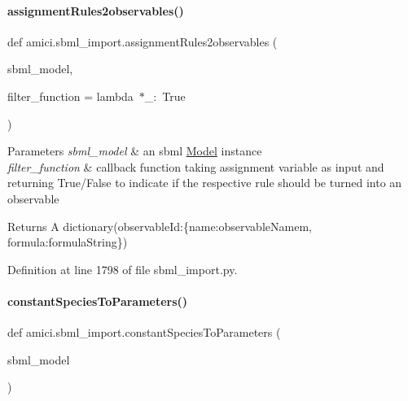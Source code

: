 \paragraph{\texorpdfstring{assignment\+Rules2observables()}{assignmentRules2observables()}}
{\footnotesize\ttfamily def amici.\+sbml\+\_\+import.\+assignment\+Rules2observables (\begin{DoxyParamCaption}\item[{}]{sbml\+\_\+model,  }\item[{}]{filter\+\_\+function = {\ttfamily lambda~$\ast$\+\_\+\+:~True} }\end{DoxyParamCaption})}


\begin{DoxyParams}{Parameters}
{\em sbml\+\_\+model} & an sbml \mbox{\hyperlink{classamici_1_1_model}{Model}} instance \\
\hline
{\em filter\+\_\+function} & callback function taking assignment variable as input and returning True/\+False to indicate if the respective rule should be turned into an observable\\
\hline
\end{DoxyParams}
\begin{DoxyReturn}{Returns}
A dictionary(observable\+Id\+:\{\textquotesingle{}name\textquotesingle{}\+:observable\+Namem, \textquotesingle{}formula\textquotesingle{}\+:formula\+String\}) 
\end{DoxyReturn}


Definition at line 1798 of file sbml\+\_\+import.\+py.

\mbox{\label{namespaceamici_1_1sbml__import_a9cee719122a45a0ac8590514a19ed5cc}} 
\paragraph{\texorpdfstring{constant\+Species\+To\+Parameters()}{constantSpeciesToParameters()}}
{\footnotesize\ttfamily def amici.\+sbml\+\_\+import.\+constant\+Species\+To\+Parameters (\begin{DoxyParamCaption}\item[{}]{sbml\+\_\+model }\end{DoxyParamCaption})}


